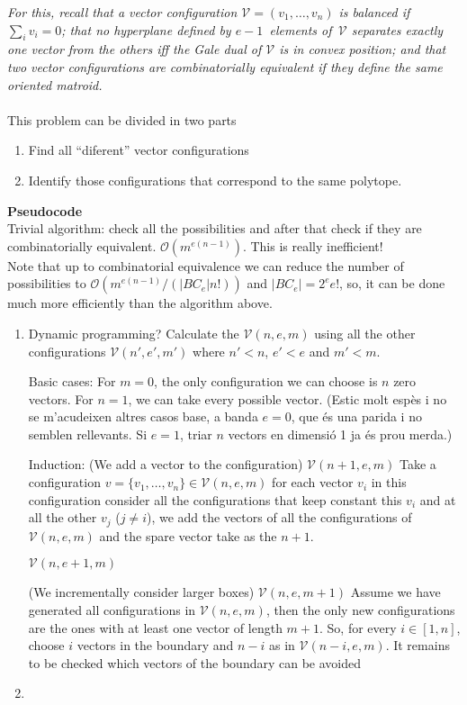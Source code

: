 \documentclass[10pt]{article}
\newcommand{\VV}{\mathcal{V}}
\begin{document}
\emph{For this, recall that a vector configuration $\VV = (v_1,\dots,v_n)$ is balanced if $\sum_i v_i=0$;
that no hyperplane defined by $e-1$~elements of~$\VV$ separates   exactly one vector from the others iff the Gale dual of $\VV$ is in   convex position; and that two vector configurations are combinatorially equivalent if they define the same oriented matroid.}
\\\\This problem can be divided in two parts
\begin{enumerate}
	\item Find all ``diferent'' vector configurations
	\item Identify those configurations that correspond to the same polytope.
\end{enumerate}
\textbf{Pseudocode}
\\Trivial algorithm: check all the possibilities and after that check if they are combinatorially equivalent. $\mathcal{O}(m^{e(n-1)})$. This is really inefficient!
\\Note that up to combinatorial equivalence we can reduce the number of possibilities to $\mathcal{O}(m^{e(n-1)}/(|BC_e|n!))$ and $|BC_e| = 2^e e!$, so, it can be done much more efficiently than the algorithm above.
\begin{enumerate}
\item Dynamic programming? Calculate the $\mathcal{V}(n,e,m)$ using all the other configurations $\mathcal{V}(n',e',m')$ where $n'<n$, $e'<e$ and $m'<m$. 

Basic cases:
For $m=0$, the only configuration we can choose is $n$ zero vectors.
For $n=1$, we can take every possible vector.
(Estic molt esp\`es i no se m'acudeixen altres casos base, a banda $e=0$, que \'es una parida i no semblen rellevants. Si $e=1$, triar $n$ vectors en dimensi\'o 1 ja \'es prou merda.)

Induction:
(We add a vector to the configuration) $\mathcal{V}(n + 1,e,m)$
Take a configuration $v = \{v_1, \ldots, v_n\}\in \mathcal{V}(n,e,m)$ for each vector $v_i$ in this configuration consider all the configurations that keep constant this $v_i$ and at all the other $v_j$ ($j \neq i$), we add the vectors of all the configurations of $\mathcal{V}(n,e,m)$ and the spare vector take as the $n+1$.

$\mathcal{V}(n,e + 1,m)$

(We incrementally consider larger boxes) $\mathcal{V}(n,e,m + 1)$
Assume we have generated all configurations in $\mathcal{V}(n,e,m)$, then the only new configurations are the ones with at least one vector of length $m+1$. So, for every $i \in [1,n]$, choose $i$ vectors in the boundary and $n-i$ as in $\mathcal{V}(n-i,e,m)$. It remains to be checked which vectors of the boundary can be avoided


\item
\end{enumerate}
\end{document}
